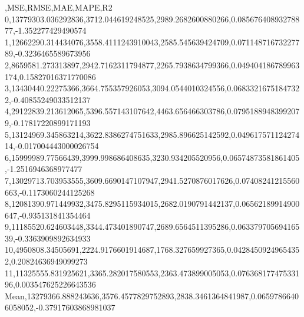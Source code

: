 ,MSE,RMSE,MAE,MAPE,R2
0,13779303.036292836,3712.044619248525,2989.2682600880266,0.08567640893278877,-1.352277429490574
1,12662290.314434076,3558.4111243910043,2585.545639424709,0.07114871673227789,-0.3236465589673956
2,8659581.273313897,2942.7162311794877,2265.7938634799366,0.049404186789963174,0.15827016371770086
3,13430440.22275366,3664.755357926053,3094.0544010324556,0.06833216751847322,-0.40855249033512137
4,29122839.213612065,5396.557143107642,4463.656466303786,0.07951889483992079,-0.17817220899171193
5,13124969.345863214,3622.8386274751633,2985.896625142592,0.04961757112427414,-0.017004443000026754
6,15999989.77566439,3999.998686408635,3230.934205520956,0.06574873581861405,-1.2516946368977477
7,13029713.703953555,3609.6690147107947,2941.5270876017626,0.07408241215560663,-0.1173060244125268
8,12081390.971449932,3475.8295115934015,2682.0190791442137,0.06562189914900647,-0.935131841354464
9,11185520.624603448,3344.473401890747,2689.6564511395286,0.06337970569416539,-0.3363909892634933
10,4950808.34505691,2224.9176601914687,1768.327659927365,0.04284509249654352,0.20824636949099273
11,11325555.831925621,3365.282017580553,2363.473899005053,0.07636817747533196,0.003547625226643536
Mean,13279366.888243636,3576.4577829752893,2838.3461364841987,0.06597866406058052,-0.37917603868981037
